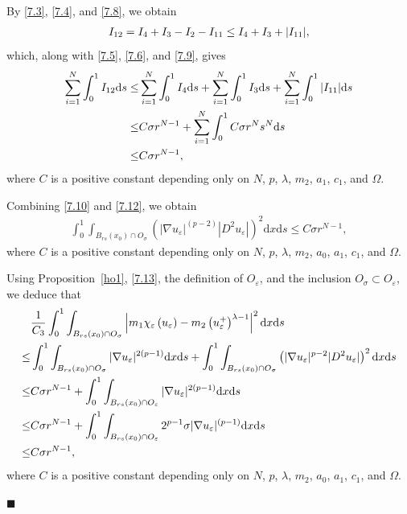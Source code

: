 \documentclass[onecolumn]{autart}
\newenvironment{proof}{{\it Proof: \enspace}}{\hfill $\blacksquare$\par}
\begin{document}
\begin{proof}
		By \eqref{7.3}, \eqref{7.4}, and \eqref{7.8}, we obtain
		\begin{align}
			I_{12}=I_4 + I_3  -I_2 -I_{11}\leq I_4 + I_3 + |I_{11}|, \notag
		\end{align}
		which, along with \eqref{7.5}, \eqref{7.6}, and \eqref{7.9},  gives
		\begin{align}
			\sum_{i=1}^{N} \int_0^1 I_{12}\mathrm{d}s
			\leq
			&\sum_{i=1}^{N} \int_0^1  I_4 \mathrm{d}s + 	\sum_{i=1}^{N} \int_0^1  I_3 \mathrm{d}s + 	\sum_{i=1}^{N} \int_0^1  |I_{11}|\mathrm{d}s
			\notag\\ \leq
			& C\sigma r^{N-1} + \sum_{i=1}^{N} \int_0^1   C\sigma r^N s^N \mathrm{d}s
			\notag\\ \leq
			& C\sigma r^{N-1},\label{7.12}
		\end{align}
		where $C$ is a positive  constant  depending only on $N$, $p$, $\lambda$, $m_2$, $a_1$,  $c_1$,  and $\Omega$.
		
		Combining \eqref{7.10} and \eqref{7.12}, we obtain
		\begin{align}\label{7.13}
			\int_0^1 \int_{B_{rs}(x_0)\cap O_{\sigma} }   \left( |\nabla u_\varepsilon|^{(p-2)} |D^2 u_{\varepsilon }| \right) ^2\mathrm{d}x \mathrm{d}s \leq C\sigma r^{N-1},
		\end{align}
		where $C$ is a positive  constant  depending only on $N$, $p$, $\lambda$, $m_2$, $a_0$, $a_1$,   $c_1$,  and $\Omega$.
		
		Using Proposition~\ref{ho1}, \eqref{7.13}, the definition of $O_\varepsilon$, and the inclusion $O_\sigma \subset O_\varepsilon$, we deduce that
		\begin{align}
			&\frac{1}{C_3} \int_0^1 \int_{B_{rs}(x_0)\cap O_{\sigma} }  \left| m_1 \chi_\varepsilon \left( u_\varepsilon \right) - m_2 \left(  u_{\varepsilon}^{+} \right) ^{\lambda-1}\right| ^2 \mathrm{d}x \mathrm{d}s
			\notag\\ \leq
			&\int_0^1 \int_{B_{rs}(x_0)\cap O_{\sigma} } |\nabla u_\varepsilon|^{2(p-1)}\mathrm{d}x \mathrm{d}s
			+ \int_0^1 \int_{B_{rs}(x_0)\cap O_{\sigma} } \left(|\nabla u_\varepsilon|^{p-2} |D^2 u_\varepsilon|\right) ^2\mathrm{d}x \mathrm{d}s
			\notag\\\leq
			& C\sigma r^{N-1} + \int_0^1 \int_{B_{rs}(x_0)\cap O_{\varepsilon} } |\nabla u_\varepsilon|^{2(p-1)}\mathrm{d}x \mathrm{d}s
			\notag\\ \leq
			& C\sigma r^{N-1} + \int_0^1 \int_{B_{rs}(x_0)\cap O_{\varepsilon} } 2^{p-1}\sigma|\nabla u_\varepsilon|^{(p-1)}\mathrm{d}x \mathrm{d}s
			\notag\\ \leq
			& C\sigma r^{N-1},\notag
		\end{align}
		where $C$ is a positive  constant  depending only on $N$, $p$, $\lambda$, $m_2$, $a_0$, $a_1$,  $c_1$,  and $\Omega$.
		

\end{proof}
\end{document}
